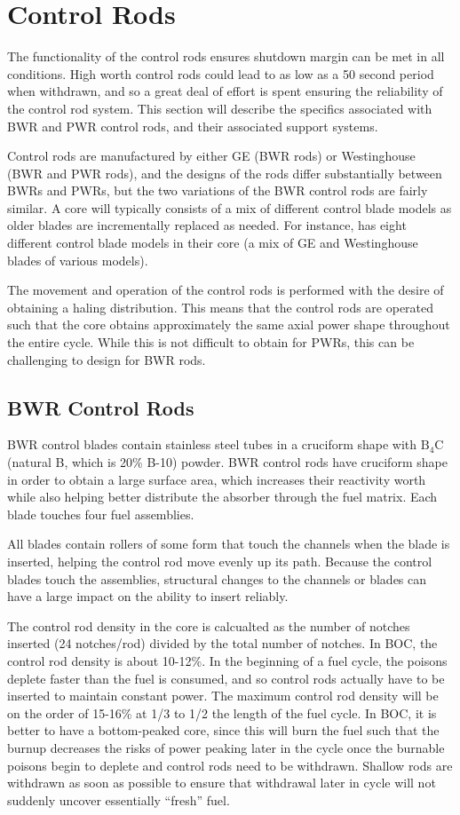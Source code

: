 \documentclass[10pt]{article}
\begin{document}
\section{Control Rods}

The functionality of the control rods ensures shutdown margin can be met in all conditions. High worth control rods could lead to as low as a 50 second period when withdrawn, and so a great deal of effort is spent ensuring the reliability of the control rod system. This section will describe the specifics associated with BWR and PWR control rods, and their associated support systems. 

Control rods are manufactured by either GE (BWR rods) or Westinghouse (BWR and PWR rods), and the designs of the rods differ substantially between BWRs and PWRs, but the two variations of the BWR control rods are fairly similar. A core will typically consists of a mix of different control blade models as older blades are incrementally replaced as needed. For instance,  has eight different control blade models in their core (a mix of GE and Westinghouse blades of various models). 

The movement and operation of the control rods is performed with the desire of obtaining a haling distribution. This means that the control rods are operated such that the core obtains approximately the same axial power shape throughout the entire cycle. While this is not difficult to obtain for PWRs, this can be challenging to design for BWR rods. 

\subsection{BWR Control Rods}
BWR control blades contain stainless steel tubes in a cruciform shape with \(\textrm{B}_4\)C (natural B, which is 20\% B-10) powder. BWR control rods have cruciform shape in order to obtain a large surface area, which increases their reactivity worth while also helping better distribute the absorber through the fuel matrix. Each blade touches four fuel assemblies. 

All blades contain rollers of some form that touch the channels when the blade is inserted, helping the control rod move evenly up its path. Because the control blades touch the assemblies, structural changes to the channels or blades can have a large impact on the ability to insert reliably.

The control rod density in the core is calcualted as the number of notches inserted (24 notches/rod) divided by the total number of notches. In BOC, the control rod density is about 10-12\%. In the beginning of a fuel cycle, the poisons deplete faster than the fuel is consumed, and so control rods actually have to be inserted to maintain constant power. The maximum control rod density will be on the order of 15-16\% at 1/3 to 1/2 the length of the fuel cycle. In BOC, it is better to have a bottom-peaked core, since this will burn the fuel such that the burnup decreases the risks of power peaking later in the cycle once the burnable poisons begin to deplete and control rods need to be withdrawn. Shallow rods are withdrawn as soon as possible to ensure that withdrawal later in cycle will not suddenly uncover essentially “fresh” fuel. 
\end{document}
